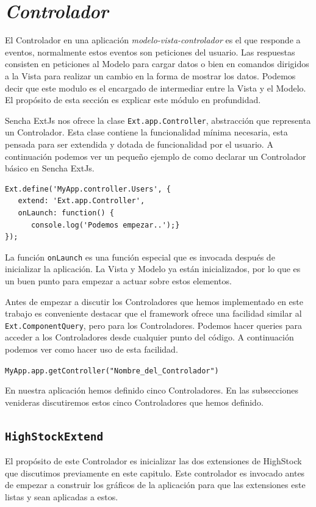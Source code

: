 \section{\emph{Controlador}}
	El Controlador en una aplicación \emph{modelo-vista-controlador}\cite{MVCWiki} es el que responde a eventos, normalmente estos eventos son
	peticiones del usuario. Las respuestas consisten en peticiones al Modelo para cargar datos o bien en comandos dirigidos a la Vista para
	realizar un cambio en la forma de mostrar los datos. Podemos decir que este modulo es el encargado de intermediar entre la Vista y el Modelo.
	El propósito de esta sección es explicar este módulo en profundidad.
	\par
	Sencha ExtJs nos ofrece la clase \texttt{Ext.app.Controller}, abstracción que representa un Controlador. Esta clase contiene la funcionalidad
	mínima necesaria, esta pensada para ser extendida y dotada de funcionalidad por el usuario. A continuación podemos ver un pequeño ejemplo de
	como declarar un Controlador básico en Sencha ExtJs.
	\begin{lstlisting}
Ext.define('MyApp.controller.Users', {
   extend: 'Ext.app.Controller',
   onLaunch: function() {
      console.log('Podemos empezar..');}
});
	\end{lstlisting}
	La función \texttt{onLaunch} es una función especial que es invocada después de inicializar la aplicación. La Vista y Modelo ya están
	inicializados, por lo que es un buen punto para empezar a actuar sobre estos elementos.
	\par
	Antes de empezar a discutir los Controladores que hemos implementado en este trabajo es conveniente destacar que el framework ofrece una
	facilidad similar al \texttt{Ext.ComponentQuery}, pero para los Controladores. Podemos hacer queries para acceder a los Controladores desde
	cualquier punto del código. A continuación podemos ver como hacer uso de esta facilidad.
    		\begin{center} \texttt{MyApp.app.getController("Nombre\_del\_Controlador")}  \end{center}
	\par
	En nuestra aplicación hemos definido cinco Controladores. En las subsecciones venideras discutiremos estos cinco Controladores que hemos
	definido.
	\subsection{\texttt{HighStockExtend}}
		El propósito de este Controlador es inicializar las dos extensiones de HighStock que discutimos previamente en este capitulo. Este controlador es
		invocado antes de empezar a construir los gráficos de la aplicación para que las extensiones este listas y sean aplicadas a estos.
